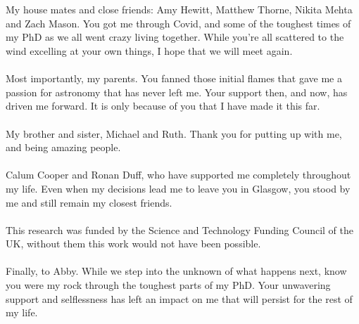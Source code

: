 \begin{acknowledgements}
\\
\\
My house mates and close friends: Amy Hewitt, Matthew Thorne, Nikita Mehta and Zach Mason. You got me through Covid, and some of the toughest times of my PhD as we all went crazy living together. While you're all scattered to the wind excelling at your own things, I hope that we will meet again.
\\
\\
Most importantly, my parents. You fanned those initial flames that gave me a passion for astronomy that has never left me. Your support then, and now, has driven me forward. It is only because of you that I have made it this far.
\\
\\
My brother and sister, Michael and Ruth. Thank you for putting up with me, and being amazing people.
\\
\\
Calum Cooper and Ronan Duff, who have supported me completely throughout my life. Even when my decisions lead me to leave you in Glasgow, you stood by me and still remain my closest friends.
\\
\\
This research was funded by the Science and Technology Funding Council of the UK, without them this work would not have been possible.
\\
\\
Finally, to Abby. While we step into the unknown of what happens next, know you were my rock through the toughest parts of my PhD. Your unwavering support and selflessness has left an impact on me that will persist for the rest of my life.

\end{acknowledgements}

